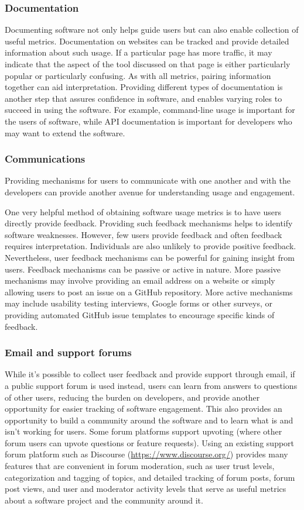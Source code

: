\subsubsection{Documentation}
Documenting software not only helps guide users but can also enable collection of useful metrics.  Documentation on websites can be tracked and provide detailed information about such usage. If a particular page has more traffic, it may indicate that the aspect of the tool discussed on that page is either particularly popular or particularly confusing. As with all metrics, pairing information together can aid interpretation. Providing different types of documentation is another step that assures confidence in software, and enables varying roles to succeed in using the software. For example, command-line usage is important for the users of software, while API documentation is important for developers who may want to extend the software.

\subsubsection{Communications} 
Providing mechanisms for users to communicate with one another and with the developers can provide another avenue for understanding usage and engagement.

One very helpful method of obtaining software usage metrics is to have users directly provide feedback. Providing such feedback mechanisms helps to identify software weaknesses. However, few users provide feedback and often feedback requires interpretation. Individuals are also unlikely to provide positive feedback. Nevertheless, user feedback mechanisms can be powerful for gaining insight from users. 
Feedback mechanisms can be passive or active in nature. More passive mechanisms may involve providing an email address on a website or simply allowing users to post an issue on a GitHub repository. More active mechanisms may include usability testing interviews, Google forms or other surveys, or providing automated GitHub issue templates to encourage specific kinds of feedback.


\subsubsection{Email and support forums}
While it’s possible to collect user feedback and provide support through email,  if a public support forum is used instead, users can learn from answers to questions of other users, reducing the burden on developers, and provide another opportunity for easier tracking of software engagement. This also provides an opportunity to build a community around the software and to learn what is and isn’t working for users. Some forum platforms support upvoting (where other forum users can upvote questions or feature requests). Using an existing support forum platform such as Discourse (\url{https://www.discourse.org/}) provides many features that are convenient in forum moderation, such as user trust levels, categorization and tagging of topics, and detailed tracking of forum posts, forum post views, and user and moderator activity levels that serve as useful metrics about a software project and the community around it.

